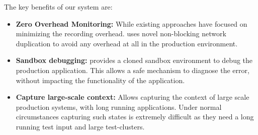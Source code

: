 \noindent
The key benefits of our system are:
\begin{itemize}[leftmargin=*,topsep=0pt,itemsep=-1ex,partopsep=1ex,parsep=1ex]
\item \textbf{Zero Overhead Monitoring:} While existing approaches have focused on minimizing the recording overhead. 
\parikshan uses novel non-blocking network duplication to avoid any overhead at all in the production environment.	
\item \textbf{Sandbox debugging:} \parikshan provides a cloned sandbox environment to debug the production application.
This allows a safe mechanism to diagnose the error, without impacting the functionality of the application.
\item \textbf{Capture large-scale context:} Allows capturing the context of large scale production systems, with long running applications. Under normal circumstances capturing such states is extremely difficult as they need a long running test input and large test-clusters.
\end{itemize}


